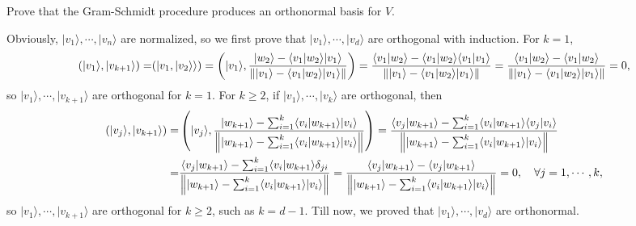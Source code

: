 \documentclass[en]{sol-man}
\begin{document}
\begin{exe}
    Prove that the Gram-Schmidt procedure produces an orthonormal basis for $V$.
\end{exe}
\begin{sol}
    Obviously, $\lvert v_1\rangle,\cdots,\lvert v_n\rangle$ are normalized, so we first prove that $\lvert v_1\rangle,\cdots,\lvert v_d\rangle$ are orthogonal with induction.
    For $k=1$,
    \begin{align}
        (\lvert v_1\rangle,\lvert v_{k+1}\rangle)=&(\lvert v_1,\lvert v_2\rangle\rangle)=\left(\lvert v_1\rangle,\frac{\lvert w_2\rangle-\langle v_1\vert w_2\rangle\lvert v_1\rangle}{\left\lVert\lvert v_1\rangle-\langle v_1\vert w_2\rangle\lvert v_1\rangle\right\rVert}\right)=\frac{\langle v_1\vert w_2\rangle-\langle v_1\vert w_2\rangle\langle v_1\vert v_1\rangle}{\left\lVert\lvert v_1\rangle-\langle v_1\vert w_2\rangle\lvert v_1\rangle\right\rVert}=\frac{\langle v_1\vert w_2\rangle-\langle v_1\vert w_2\rangle}{\left\lVert\lvert v_1\rangle-\langle v_1\vert w_2\rangle\lvert v_1\rangle\right\rVert}=0,\\
    \end{align}
    so $\lvert v_1\rangle,\cdots,\lvert v_{k+1}\rangle$ are orthogonal for $k=1$.
    For $k\geq 2$, if $\lvert v_1\rangle,\cdots,\lvert v_k\rangle$ are orthogonal, then
    \begin{align}
        \notag(\lvert v_j\rangle,\lvert v_{k+1}\rangle)=&\left(\lvert v_j\rangle,\frac{\lvert w_{k+1}\rangle-\sum_{i=1}^k\langle v_i\vert w_{k+1}\rangle\lvert v_i\rangle}{\left\lVert\lvert w_{k+1}\rangle-\sum_{i=1}^k\langle v_i\vert w_{k+1}\rangle\lvert v_i\rangle\right\rVert}\right)=\frac{\langle v_j\vert w_{k+1}\rangle-\sum_{i=1}^k\langle v_i\vert w_{k+1}\rangle\langle v_j\vert v_i\rangle}{\left\lVert\lvert w_{k+1}\rangle-\sum_{i=1}^k\langle v_i\vert w_{k+1}\rangle\lvert v_i\rangle\right\rVert}\\
        =&\frac{\langle v_j\vert w_{k+1}\rangle-\sum_{i=1}^k\langle v_i\vert w_{k+1}\rangle\delta_{ji}}{\left\lVert\lvert w_{k+1}\rangle-\sum_{i=1}^k\langle v_i\vert w_{k+1}\rangle\lvert v_i\rangle\right\rVert}=\frac{\langle v_j\vert w_{k+1}\rangle-\langle v_j\vert w_{k+1}\rangle}{\left\lVert\lvert w_{k+1}\rangle-\sum_{i=1}^k\langle v_i\vert w_{k+1}\rangle\lvert v_i\rangle\right\rVert}=0,\quad\forall j=1,\cdots,k,
    \end{align}
    so $\lvert v_1\rangle,\cdots,\lvert v_{k+1}\rangle$ are orthogonal for $k\geq 2$, such as $k=d-1$.
    Till now, we proved that $\lvert v_1\rangle,\cdots,\lvert v_d\rangle$ are orthonormal.


\end{sol}
\end{document}
